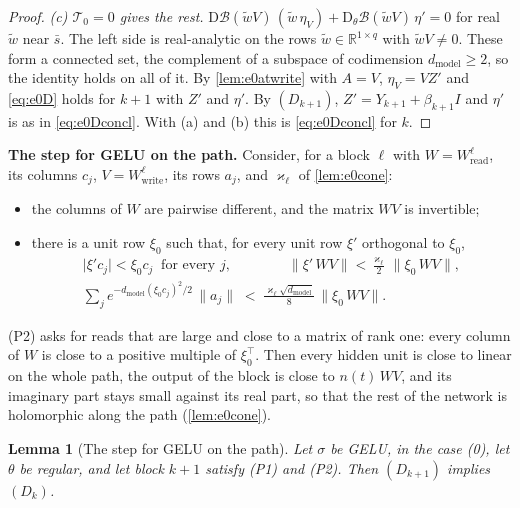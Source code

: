 \documentclass[10pt]{article}
\newtheorem{lemma}[theorem]{Lemma}
\theoremstyle{definition}
\theoremstyle{remark}
\newcommand{\R}{\mathbb{R}}
\newcommand{\Wread}{W_{\mathrm{read}}}
\newcommand{\Wwrite}{W_{\mathrm{write}}}
\newcommand{\dm}{d_{\mathrm{model}}}
\newcommand{\Der}{\mathrm{D}}
\newcommand{\norm}[1]{\lVert #1\rVert}
\newcommand{\para}[1]{\smallskip\noindent\textbf{#1}\hspace{0.5em}}
\begin{document}
\begin{proof}
\emph{(c) $\mathcal T_0 = 0$ gives the rest.} $\Der\mathcal B(\tilde wV)\,(\tilde w\,\eta_V) + \Der_\theta\mathcal B(\tilde wV)\,\eta' = 0$ for real $\tilde w$ near $\bar s$. The left side is real-analytic on the rows $\tilde w \in \R^{1\times q}$ with $\tilde wV \neq 0$. These form a connected set, the complement of a subspace of codimension $\dm \ge 2$, so the identity holds on all of it. By \cref{lem:e0atwrite} with $A = V$, $\eta_V = VZ'$ and \eqref{eq:e0D} holds for $k+1$ with $Z'$ and $\eta'$. By $(D_{k+1})$, $Z' = Y_{k+1} + \beta_{k+1}I$ and $\eta'$ is as in \eqref{eq:e0Dconcl}. With (a) and (b) this is \eqref{eq:e0Dconcl} for $k$.
\end{proof}

\para{The step for GELU on the path.} Consider, for a block $\ell$ with $W = \Wread^{\ell}$, its columns $c_j$, $V = \Wwrite^{\ell}$, its rows $a_j$, and $\varkappa_\ell$ of \cref{lem:e0cone}:
\begin{itemize}[leftmargin=2.9em]
\item[(P1)] the columns of $W$ are pairwise different, and the matrix $WV$ is invertible;
\item[(P2)] there is a unit row $\xi_0$ such that, for every unit row $\xi'$ orthogonal to $\xi_0$,
\begin{gather*}
\lvert\xi'c_j\rvert < \xi_0c_j \ \text{ for every } j, \qquad\qquad
\norm{\xi'\,WV} < \frac{\varkappa_\ell}{2}\,\norm{\xi_0\,WV}, \\
\sum_{j}e^{-\dm(\xi_0c_j)^2/2}\,\norm{a_j} \;<\; \frac{\varkappa_\ell\sqrt{\dm}}{8}\,\norm{\xi_0\,WV} .
\end{gather*}
\end{itemize}
(P2) asks for reads that are large and close to a matrix of rank one: every column of $W$ is close to a positive multiple of $\xi_0^\top$. Then every hidden unit is close to linear on the whole path, the output of the block is close to $n(t)\,WV$, and its imaginary part stays small against its real part, so that the rest of the network is holomorphic along the path (\cref{lem:e0cone}).

\begin{lemma}[The step for GELU on the path]\label{lem:e0stepgelu}
Let $\sigma$ be GELU, in the case (0), let $\theta$ be regular, and let block $k+1$ satisfy (P1) and (P2). Then $(D_{k+1})$ implies $(D_k)$.
\end{lemma}
\end{document}
